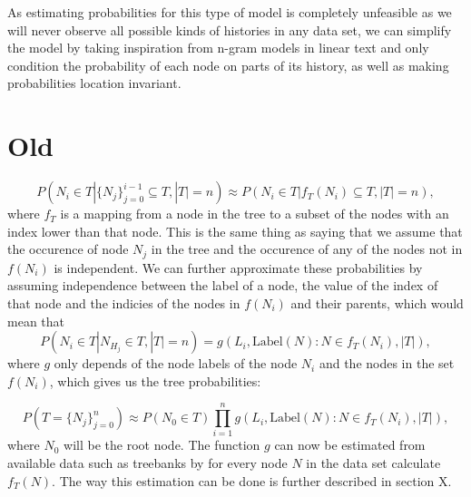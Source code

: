 As estimating probabilities for this type of model is completely unfeasible as we will never observe all possible kinds of histories in any data set, we can simplify the model by taking inspiration from n-gram models in linear text and only condition the probability of each node on parts of its history, as well as making probabilities location invariant. %
\section{Old}
\begin{equation*}
P(N_i\in T | \{N_j\}_{j=0}^{i-1}\subseteq T, |T|=n) \approx 
P(N_i\in T | f_T(N_i) \subseteq T, |T|=n) ,
\end{equation*}
where $f_T$ is a mapping from a node in the tree to a subset of the nodes with an index lower than that node. This is the same thing as saying that we assume that the occurence of node $N_j$ in the tree and the occurence of any of the nodes not in $f(N_i)$ is independent.
We can further approximate these probabilities by assuming independence between the label of a node, the value of the index of that node and the indicies of the nodes in $f(N_i)$ and their parents, which would mean that  
\begin{equation*}
P(N_i\in T | N_{H_j} \in T, |T|=n) = g(L_i, \text{Label} (N):N\in f_T(N_i), |T|),
\end{equation*}
where $g$ only depends of the node labels of the node $N_i$ and the nodes in the set $f(N_i)$, which gives us the tree probabilities: 

\begin{equation*}
    P(T=\{N_j\}_{j=0}^n) \approx P(N_0\in T) \prod_{i=1}^{n}g(L_i, \text{Label} (N):N\in f_T(N_i), |T|),
\end{equation*}
where $N_0$ will be the root node. The function $g$ can now be estimated from available data such as treebanks by for every node $N$ in the data set calculate $f_T(N)$. The way this estimation can be done is further described in section X. 

